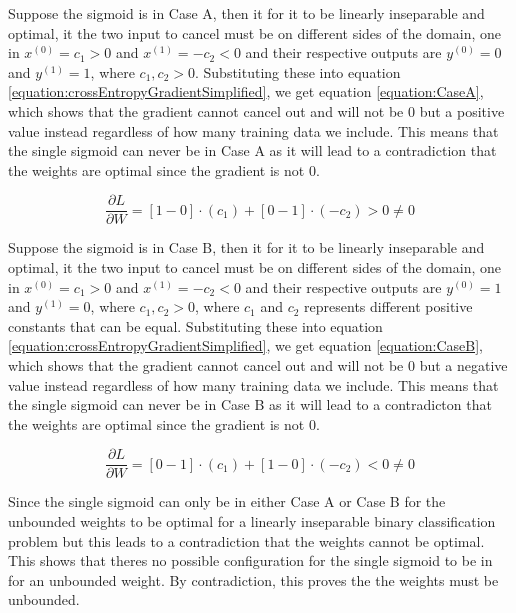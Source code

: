 \documentclass[a4paper,12pt]{article}
\begin{document}
Suppose the sigmoid is in Case A, then it for it to be linearly inseparable and optimal, it the two input to cancel must be on different sides of the domain, one in $x^(0) = c_{1} > 0$ and  $x^(1) = -c_{2} < 0$ and their respective outputs are  $y^(0) = 0$ and  $y^(1) = 1$, where $c_{1}, c_{2} > 0$. 
Substituting these into equation \ref{equation:crossEntropyGradientSimplified}, we get
equation \ref{equation:CaseA}, which shows that the gradient cannot cancel out and will not be 0 but a positive value instead regardless of how many training data we include. This means that the single sigmoid can never be in Case A as it will lead to a contradiction that the weights are optimal since the gradient is not 0. 

\begin{equation}
\label{equation:CaseA}
\frac{\partial L}{\partial W} = [1 - 0] \cdot (c_{1}) + [0 - 1] \cdot (-c_{2}) > 0 \neq 0
\end{equation}

Suppose the sigmoid is in Case B, then it for it to be linearly inseparable and optimal, it the two input to cancel must be on different sides of the domain, one in $x^(0) = c_{1} > 0$ and  $x^(1) = -c_{2} < 0$ and their respective outputs are  $y^(0) = 1$ and  $y^(1) = 0$, where $c_{1}, c_{2} > 0$, where $c_{1}$ and $c_{2}$ represents different positive constants that can be equal.  
Substituting these into equation \ref{equation:crossEntropyGradientSimplified}, we get
equation \ref{equation:CaseB}, which shows that the gradient cannot cancel out and will not be 0 but a negative value instead regardless of how many training data we include. This means that the single sigmoid can never be in Case B as it will lead to a contradicton that the weights are optimal since the gradient is not 0. 

\begin{equation}
\label{equation:CaseB}
\frac{\partial L}{\partial W} = [0 - 1] \cdot (c_{1}) + [1 - 0] \cdot (-c_{2}) < 0 \neq 0
\end{equation}

Since the single sigmoid can only be in either Case A or Case B for the unbounded weights to be optimal for a linearly inseparable binary classification problem but this leads to a contradiction that the weights cannot be optimal. This shows that theres no possible configuration for the single sigmoid to be in for an unbounded weight. By contradiction, this proves the the weights must be unbounded. 

\clearpage
\end{document}
